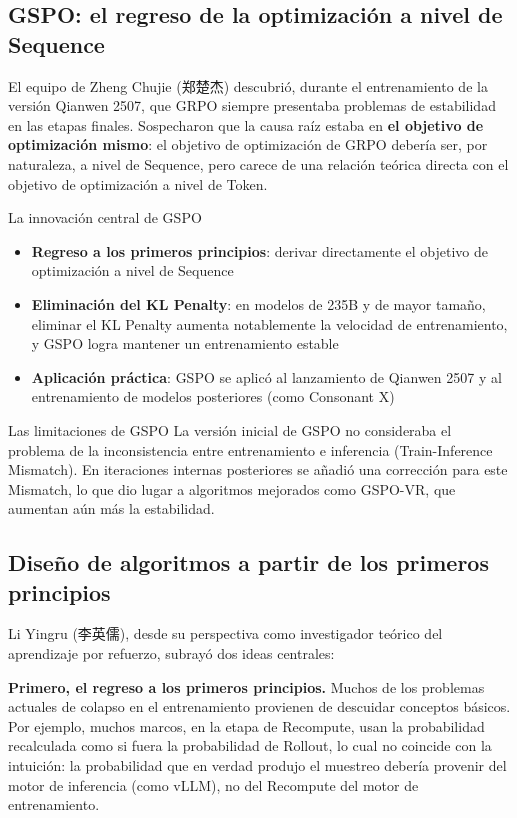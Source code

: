 \subsection{GSPO: el regreso de la optimización a nivel de Sequence}

El equipo de Zheng Chujie (郑楚杰) descubrió, durante el entrenamiento de la versión Qianwen 2507, que GRPO siempre presentaba problemas de estabilidad en las etapas finales. Sospecharon que la causa raíz estaba en \textbf{el objetivo de optimización mismo}: el objetivo de optimización de GRPO debería ser, por naturaleza, a nivel de Sequence, pero carece de una relación teórica directa con el objetivo de optimización a nivel de Token.

\begin{importantbox}{La innovación central de GSPO}
\begin{itemize}
    \item \textbf{Regreso a los primeros principios}: derivar directamente el objetivo de optimización a nivel de Sequence
    \item \textbf{Eliminación del KL Penalty}: en modelos de 235B y de mayor tamaño, eliminar el KL Penalty aumenta notablemente la velocidad de entrenamiento, y GSPO logra mantener un entrenamiento estable
    \item \textbf{Aplicación práctica}: GSPO se aplicó al lanzamiento de Qianwen 2507 y al entrenamiento de modelos posteriores (como Consonant X)
\end{itemize}
\end{importantbox}

\begin{warningbox}{Las limitaciones de GSPO}
La versión inicial de GSPO no consideraba el problema de la inconsistencia entre entrenamiento e inferencia (Train-Inference Mismatch). En iteraciones internas posteriores se añadió una corrección para este Mismatch, lo que dio lugar a algoritmos mejorados como GSPO-VR, que aumentan aún más la estabilidad.
\end{warningbox}

\subsection{Diseño de algoritmos a partir de los primeros principios}

Li Yingru (李英儒), desde su perspectiva como investigador teórico del aprendizaje por refuerzo, subrayó dos ideas centrales:

\textbf{Primero, el regreso a los primeros principios.} Muchos de los problemas actuales de colapso en el entrenamiento provienen de descuidar conceptos básicos. Por ejemplo, muchos marcos, en la etapa de Recompute, usan la probabilidad recalculada como si fuera la probabilidad de Rollout, lo cual no coincide con la intuición: la probabilidad que en verdad produjo el muestreo debería provenir del motor de inferencia (como vLLM), no del Recompute del motor de entrenamiento.

